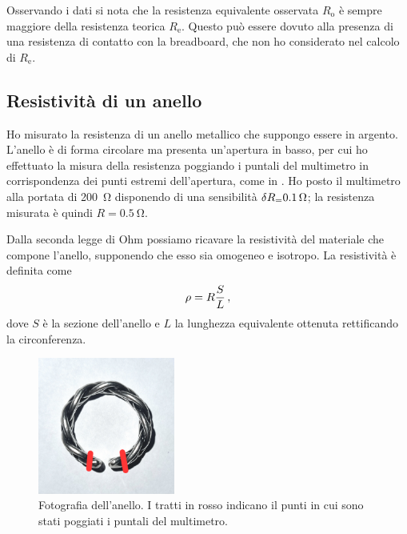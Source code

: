             Osservando i dati si nota che la resistenza equivalente osservata $R_\text{o}$ è sempre maggiore della resistenza teorica $R_\text{e}$. Questo può essere dovuto alla presenza di una resistenza di contatto con la breadboard, che non ho considerato nel calcolo di $R_\text{e}$.

        \subsection{Resistività di un anello}
            Ho misurato la resistenza di un anello metallico che suppongo essere in argento. L'anello è di forma circolare ma presenta un'apertura in basso, per cui ho effettuato la misura della resistenza poggiando i puntali del multimetro in corrispondenza dei punti estremi dell'apertura, come in . Ho posto il multimetro alla portata di \SI{200}{\ohm} disponendo di una sensibilità $\delta R_\text = \SI{0.1}{\ohm}$; la resistenza misurata è quindi $R = \SI{0.5}{\ohm}$.

            Dalla seconda legge di Ohm possiamo ricavare la resistività del materiale che compone l'anello, supponendo che esso sia omogeneo e isotropo. La resistività è definita come
            \begin{equation}
                \rho = R\frac{S}{L}
                \,,
                \label{eq:mul:ohm-law}
            \end{equation}
            dove $S$ è la sezione dell'anello e $L$ la lunghezza equivalente ottenuta rettificando la circonferenza.
            \begin{figure}
                \centering
                \includegraphics[width=0.4\textwidth]{images/multimetro/anello.jpg}
                \caption{Fotografia dell'anello. I tratti in rosso indicano il punti in cui sono stati poggiati i puntali del multimetro.}
                \label{fig:mul:anello}
            \end{figure}


